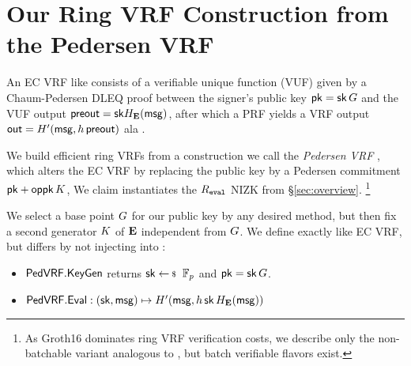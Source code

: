 \section{Our Ring VRF Construction from the Pedersen VRF}
\label{sec:pederson_vrf}

An EC VRF like \cite{nsec5,VXEd25519,draft-irtf-cfrg-vrf-10} consists of
a verifiable unique function (VUF) given by a Chaum-Pedersen DLEQ proof
between the signer's public key $\mathsf{pk} = \mathsf{sk} \, G$ and
 the VUF output ${\mathsf{preout}} = \mathsf{sk} H_{{\mathbf{E}}}(\mathsf{msg})$,
after which a PRF  yields a VRF output
 ${\mathsf{out}} = H'(\mathsf{msg}, h \, {\mathsf{preout}})$ ala \cite[Proposition 1]{vrf_micali}.

We build efficient ring VRFs from a construction we call the
{\em Pedersen VRF} \PedVRF, which alters the EC VRF by replacing the
public key by a Pedersen commitment $\mathsf{pk} + \mathsf{oppk} \, K$,
We claim \PedVRF instantiates the $R_{\mathtt{eval}}$ NIZK from \S\ref{sec:overview}.
\footnote{As Groth16 dominates ring VRF verification costs,
we describe only the non-batchable variant analogous to
\cite{nsec5,VXEd25519,draft-irtf-cfrg-vrf-10}, but
 batch verifiable flavors exist.}


We select a base point $G$ for our public key by any desired method,
but then fix a second generator $K$ of ${\mathbf{E}}$ independent from $G$.
%
We define \KeyGen exactly like EC VRF, but
 \Eval differs by not injecting \pk into \msg:
\begin{itemize}
\item ${\mathsf{PedVRF}}.{\mathsf{KeyGen}}$ \quad returns $\sk \leftsample \F_p$ and $\mathsf{pk} = \mathsf{sk} \, G$.
\item ${\mathsf{PedVRF}}.{\mathsf{Eval}} : (\mathsf{sk},\mathsf{msg}) \mapsto H'(\mathsf{msg}, h \, \mathsf{sk} \, H_{{\mathbf{E}}}(\mathsf{msg}))$
\end{itemize}

